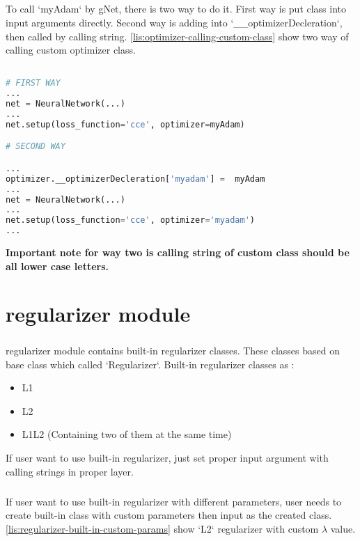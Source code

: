 \documentclass[12pt]{report}
\begin{document}
\paragraph{}
To call `myAdam` by gNet, there is two way to do it. First way is put class into input arguments directly. Second way is adding into  `\_\_optimizerDecleration`, then called by calling string. \ref{lis:optimizer-calling-custom-class} show two way of calling custom optimizer class.

\begin{lstlisting}[language=Python, numbers=none, caption={Calling custom optimizer class.}, label={lis:optimizer-calling-custom-class}]

# FIRST WAY
...
net = NeuralNetwork(...)
...
net.setup(loss_function='cce', optimizer=myAdam)

# SECOND WAY

...
optimizer.__optimizerDecleration['myadam'] =  myAdam
...
net = NeuralNetwork(...)
...
net.setup(loss_function='cce', optimizer='myadam')
...

\end{lstlisting}

\textbf{Important note for way two is calling string of custom class should be all lower case letters. }






\chapter{regularizer module}
\label{ch:regularizer}

\paragraph{}
regularizer module contains built-in regularizer classes. These classes based on base class which called `Regularizer`. Built-in regularizer classes as : 

\begin{itemize}
	\item L1
	\item L2
	\item L1L2 (Containing two of them at the same time)
\end{itemize}

If user want to use built-in regularizer, just set proper input argument with calling strings in proper layer. 

\paragraph{}
If user want to use built-in regularizer with different parameters, user needs to create built-in class with custom parameters then input as the created class. \ref{lis:regularizer-built-in-custom-params} show `L2` regularizer with custom $\lambda$ value.
\end{document}
